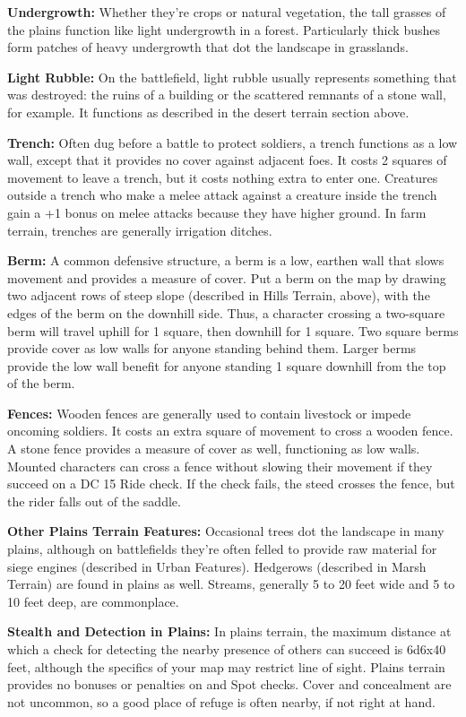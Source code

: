 \textbf{Undergrowth:} Whether they're crops or natural vegetation, the tall grasses 
of the plains function like light undergrowth in a forest. Particularly thick bushes 
form patches of heavy undergrowth that dot the landscape in grasslands.

\textbf{Light Rubble:} On the battlefield, light rubble usually represents something 
that was destroyed: the ruins of a building or the scattered remnants of a stone 
wall, for example. It functions as described in the desert terrain section above.

\textbf{Trench:} Often dug before a battle to protect soldiers, a trench functions 
as a low wall, except that it provides no cover against adjacent foes. It costs 
2 squares of movement to leave a trench, but it costs nothing extra to enter one. 
Creatures outside a trench who make a melee attack against a creature inside the 
trench gain a +1 bonus on melee attacks because they have higher ground. In farm 
terrain, trenches are generally irrigation ditches.

\textbf{Berm:} A common defensive structure, a berm is a low, earthen wall that 
slows movement and provides a measure of cover. Put a berm on the map by drawing 
two adjacent rows of steep slope (described in Hills Terrain, above), with the 
edges of the berm on the downhill side. Thus, a character crossing a two-square 
berm will travel uphill for 1 square, then downhill for 1 square. Two square berms 
provide cover as low walls for anyone standing behind them. Larger berms provide 
the low wall benefit for anyone standing 1 square downhill from the top of the 
berm. 

\textbf{Fences:} Wooden fences are generally used to contain livestock or impede 
oncoming soldiers. It costs an extra square of movement to cross a wooden fence. 
A stone fence provides a measure of cover as well, functioning as low walls. Mounted 
characters can cross a fence without slowing their movement if they succeed on 
a DC 15 Ride check. If the check fails, the steed crosses the fence, but the rider 
falls out of the saddle.

\textbf{Other Plains Terrain Features:} Occasional trees dot the landscape in many 
plains, although on battlefields they're often felled to provide raw material for 
siege engines (described in Urban Features). Hedgerows (described in Marsh Terrain) 
are found in plains as well. Streams, generally 5 to 20 feet wide and 5 to 10 feet 
deep, are commonplace.

\textbf{Stealth and Detection in Plains:} In plains terrain, the maximum distance 
at which a  check for detecting the nearby presence of others can succeed is 
6d6x40 feet, although the specifics of your map may restrict 
line of sight. Plains terrain provides no bonuses or penalties on  and Spot 
checks. Cover and concealment are not uncommon, so a good place of refuge is often 
nearby, if not right at hand.

